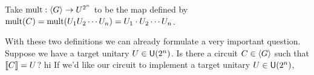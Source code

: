 Take $\operatorname{mult}: \expval{G} \to U^{2^n}$ to be the map defined by $\operatorname{mult}(C) = \operatorname{mult}(U_1U_2\cdots U_n) = U_1\cdot U_2\cdots U_n$.

With these two definitions we can already formulate a very important question.
Suppose we have a target unitary $U\in\mathsf{U}(2^n)$.
Is there a circuit $C\in\expval{G}$ such that $\llbracket C \rrbracket = U$?
hi
If we'd like our circuit to implement a target unitary $U\in\mathsf{U}(2^n)$,
